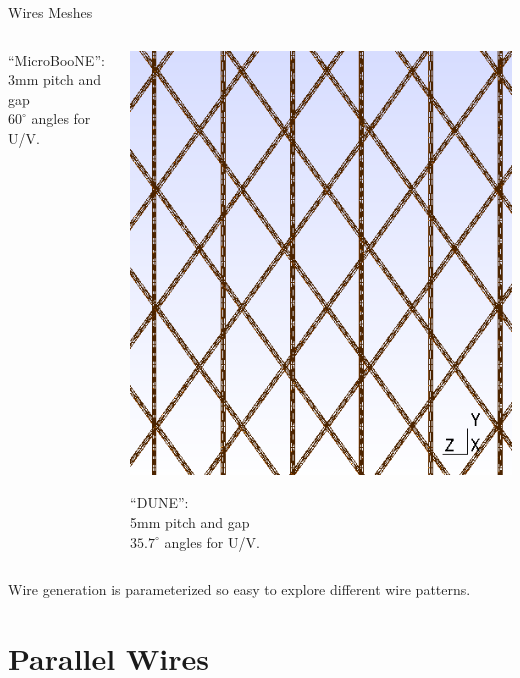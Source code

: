 \documentclass[xcolor=dvipsnames]{beamer}
\newcommand{\microboone}{MicroBooNE\xspace}
\begin{document}
\begin{frame}{Wires Meshes}
\begin{columns}
\begin{column}{0.3\textwidth}
\begin{center}
        ``\microboone'':\\3mm pitch and gap\\$60^\circ$ angles for U/V.
      \end{center}
    \end{column}
    \begin{column}{0.3\textwidth}
      \begin{center}
        \includegraphics[height=0.4\textheight]{dune-mesh.png}      

        ``DUNE'':\\5mm pitch and gap\\$35.7^\circ$ angles for U/V.
      \end{center}
    \end{column}
  \end{columns}

  \vfill

  Wire generation is parameterized so easy to explore different wire patterns.
\end{frame}

\section{Parallel Wires}
\end{document}
